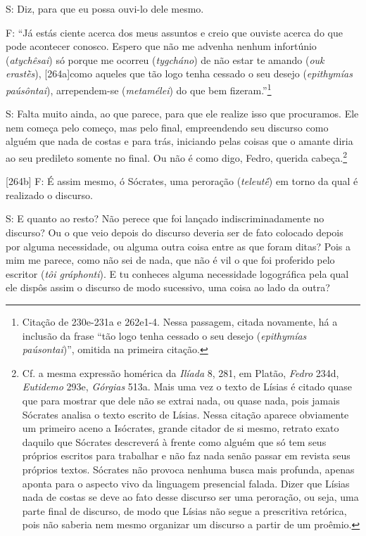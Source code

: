 S: Diz, para que eu possa ouvi-lo dele mesmo.

F: ``Já estás ciente acerca dos meus assuntos e creio que ouviste acerca
do que pode acontecer conosco. Espero que não me advenha nenhum
infortúnio (\emph{atychêsai}) só porque me ocorreu (\emph{tygcháno}) de
não estar te amando (\emph{ouk} \emph{erastḕs}), {[}264a{]}como aqueles
que tão logo tenha cessado o seu desejo (\emph{epithymías paúsôntai}),
arrependem-se (\emph{metamélei}) do que bem fizeram.''\footnote{Citação
  de 230e-231a e 262e1-4. Nessa passagem, citada novamente, há a
  inclusão da frase ``tão logo tenha cessado o seu desejo
  (\emph{epithymías paúsontai})'', omitida na primeira citação.}

S: Falta muito ainda, ao que parece, para que ele realize isso que
procuramos. Ele nem começa pelo começo, mas pelo final, empreendendo seu
discurso como alguém que nada de costas e para trás, iniciando pelas
coisas que o amante diria ao seu predileto somente no final. Ou não é
como digo, Fedro, querida cabeça.\footnote{Cf. a mesma expressão
  homérica da \emph{Ilíada} 8, 281, em Platão, \emph{Fedro} 234d,
  \emph{Eutidemo} 293e, \emph{Górgias} 513a. Mais uma vez o texto de
  Lísias é citado quase que para mostrar que dele não se extrai nada, ou
  quase nada, pois jamais Sócrates analisa o texto escrito de Lísias.
  Nessa citação aparece obviamente um primeiro aceno a Isócrates, grande
  citador de si mesmo, retrato exato daquilo que Sócrates descreverá à
  frente como alguém que só tem seus próprios escritos para trabalhar e
  não faz nada senão passar em revista seus próprios textos. Sócrates
  não provoca nenhuma busca mais profunda, apenas aponta para o aspecto
  vivo da linguagem presencial falada. Dizer que Lísias nada de costas
  se deve ao fato desse discurso ser uma peroração, ou seja, uma parte
  final de discurso, de modo que Lísias não segue a prescritiva
  retórica, pois não saberia nem mesmo organizar um discurso a partir de
  um proêmio.}

{[}264b{]} F: É assim mesmo, ó Sócrates, uma peroração (\emph{teleutḗ})
em torno da qual é realizado o discurso.

S: E quanto ao resto? Não perece que foi lançado indiscriminadamente no
discurso? Ou o que veio depois do discurso deveria ser de fato colocado
depois por alguma necessidade, ou alguma outra coisa entre as que foram
ditas? Pois a mim me parece, como não sei de nada, que não é vil o que
foi proferido pelo escritor (\emph{tôi gráphonti}). E tu conheces alguma
necessidade logográfica pela qual ele dispôs assim o discurso de modo
sucessivo, uma coisa ao lado da outra?

